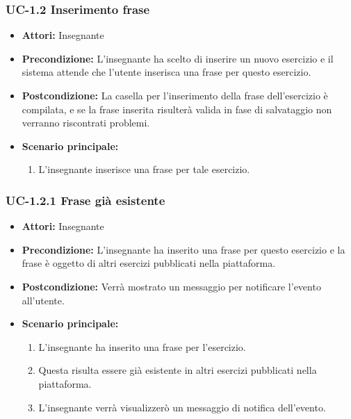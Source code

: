 \subsubsection{UC-1.2 Inserimento frase}
\begin{itemize}
\item \textbf{Attori: }Insegnante

\item \textbf{Precondizione: }L'insegnante ha scelto di inserire un nuovo esercizio e il sistema attende che l'utente inserisca una frase per questo esercizio.
\item \textbf{Postcondizione: }La casella per l'inserimento della frase dell'esercizio è compilata, e se la frase inserita risulterà valida in fase di salvataggio non verranno riscontrati problemi.
\item \textbf{Scenario principale: }
		\begin{enumerate}
		\item L'insegnante inserisce una frase per tale esercizio.
		\end{enumerate}
\end{itemize}
\subsubsection{UC-1.2.1 Frase già esistente}
\begin{itemize}
\item \textbf{Attori: }Insegnante

\item \textbf{Precondizione: }L'insegnante ha inserito una frase per questo esercizio e la frase è oggetto di altri esercizi pubblicati nella piattaforma.
\item \textbf{Postcondizione: }Verrà mostrato un messaggio per notificare l'evento all'utente.
\item \textbf{Scenario principale: }
		\begin{enumerate}
		\item L'insegnante ha inserito una frase per l'esercizio.
		\item Questa risulta essere già esistente in altri esercizi pubblicati nella piattaforma.
		\item L'insegnante verrà visualizzerò un messaggio di notifica dell'evento.
		\end{enumerate}
\end{itemize}
